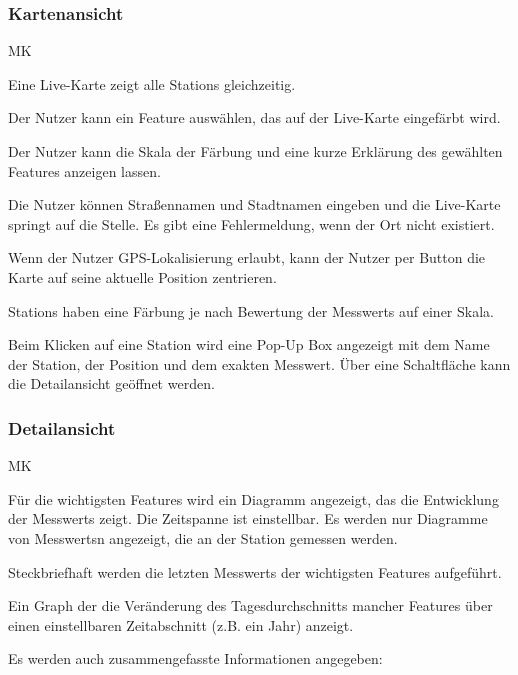 \subsubsection*{\gls{Kartenansicht}}
\begin{Kriterien}{MK}

	\item Eine \gls{Live-Karte} zeigt alle \glspl{Station} gleichzeitig. 
	
	\item Der Nutzer kann ein \gls{Feature} auswählen, das auf der \gls{Live-Karte} eingefärbt wird.
	
	\item Der Nutzer kann die Skala der Färbung und eine kurze Erklärung des gewählten \gls{Feature}s anzeigen lassen.
	
	\item Die Nutzer können Straßennamen und Stadtnamen eingeben und die \gls{Live-Karte} springt auf die Stelle. Es gibt eine Fehlermeldung, wenn der Ort nicht existiert.
	
	\item Wenn der Nutzer GPS-Lokalisierung erlaubt, kann der Nutzer per Button die Karte auf seine aktuelle Position zentrieren.

	\item \glspl{Station} haben eine Färbung je nach Bewertung der \glspl{Messwert} auf einer Skala.
	
	\item Beim Klicken auf eine \gls{Station} wird eine \gls{Pop-Up} Box angezeigt mit dem Name der Station, der Position und dem exakten \gls{Messwert}.
		Über eine Schaltfläche kann die \gls{Detailansicht} geöffnet werden. 
\end{Kriterien}

\subsubsection*{\gls{Detailansicht}}
\begin{Kriterien}{MK}
	\item Für die wichtigsten \glspl{Feature} wird ein Diagramm angezeigt, das die Entwicklung der \glspl{Messwert} zeigt. Die Zeitspanne ist einstellbar. Es werden nur Diagramme von \glspl{Messwert}n angezeigt, die an der \gls{Station} gemessen werden.
	
	\item Steckbriefhaft werden die letzten \glspl{Messwert} der wichtigsten \glspl{Feature} aufgeführt.

	\item Ein \gls{Graph} der die Veränderung des Tagesdurchschnitts mancher \glspl{Feature} über einen einstellbaren Zeitabschnitt (z.B. ein Jahr) anzeigt.
	
	\item Es werden auch zusammengefasste Informationen angegeben: 
\end{Kriterien}
		
